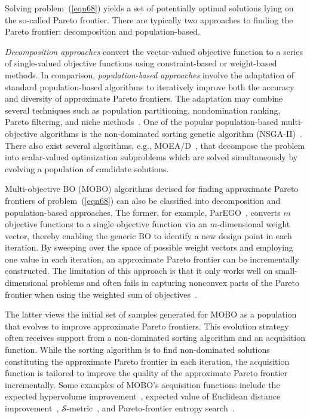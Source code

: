 \documentclass[journal ]{new-aiaa}
\begin{document}
	Solving problem~(\ref{eqn68}) yields a set of potentially optimal solutions lying on the so-called Pareto frontier.
	There are typically two approaches to finding the Pareto frontier: decomposition and population-based.
	
	\textit{Decomposition approaches} convert the vector-valued objective function to a series of single-valued objective functions using constraint-based or weight-based methods.
	In comparison, \textit{population-based approaches} involve the adaptation of standard population-based algorithms to iteratively improve both the accuracy and diversity of approximate Pareto frontiers. The adaptation may combine several techniques such as population partitioning, nondomination ranking, Pareto filtering, and niche methods~\citep{Kochenderfer2019}. 
	One of the popular population-based multi-objective algorithms is the non-dominated sorting genetic algorithm (NSGA-II)~\citep{Deb2002}.
	There also exist several algorithms, e.g., MOEA/D~\citep{ZhangQ2007}, that decompose the problem into scalar-valued optimization subproblems which are solved simultaneously by evolving a population of candidate solutions. 
	
	Multi-objective BO (MOBO) algorithms devised for finding approximate Pareto frontiers of problem~(\ref{eqn68}) can also be classified into decomposition and population-based approaches.
	The former, for example, ParEGO~\citep{Knowles2006}, converts $m$ objective functions to a single objective function via an $m$-dimensional weight vector, thereby enabling the generic BO to identify a new design point in each iteration.
	By sweeping over the space of possible weight vectors and employing one value in each iteration, an approximate Pareto frontier can be incrementally constructed.
	The limitation of this approach is that it only works well on small-dimensional problems and often fails in capturing nonconvex parts of the Pareto frontier when using the weighted sum of objectives~\citep{Das1997}.
	
	The latter views the initial set of samples generated for MOBO as a population that evolves to improve approximate Pareto frontiers.
	This evolution strategy often receives support from a non-dominated sorting algorithm and an acquisition function.
	While the sorting algorithm is to find non-dominated solutions constituting the approximate Pareto frontier in each iteration, the acquisition function is tailored to improve the quality of the approximate Pareto frontier incrementally.
	Some examples of MOBO's acquisition functions include the expected hypervolume improvement~\citep{Emmerich2006}, expected value of Euclidean distance improvement~\citep{Keane2006}, $\mathcal{S}$-metric~\citep{Ponweiser2008}, and Pareto-frontier entropy search~\citep{Suzuki2020}.
	
\end{document}
